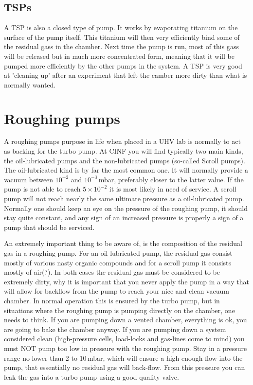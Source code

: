 \documentclass[a4paper,english]{article}
\begin{document}
\subsection{TSPs}
A TSP is also a closed type of pump. It works by evaporating titanium on the surface of the pump itself. This titanium will then very efficiently bind some of the residual gass in the chamber. Next time the pump is run, most of this gass will be released but in much more concentrated form, meaning that it will be pumped more efficiently by the other pumps in the system. A TSP is very good at 'cleaning up' after an experiment that left the camber more dirty than what is normally wanted.

\section{Roughing pumps}
A roughing pumps purpose in life when placed in a UHV lab is normally to act as backing for the turbo pump. At CINF you will find typically two main kinds, the oil-lubricated pumps and the non-lubricated pumps (so-called Scroll pumps). The oil-lubricated kind is by far the most common one. It will normally provide a vacuum between $10^{-2}$ and $10^{-3}$\,mbar, preferably closer to the latter value. If the pump is not able to reach $5\times10^{-2}$ it is most likely in need of service. A scroll pump will not reach nearly the same ultimate pressure as a oil-lubricated pump. Normally one should keep an eye on the pressure of the roughing pump, it should stay quite constant, and any sign of an increased pressure is properly a sign of a pump that should be serviced.

An extremely important thing to be aware of, is the composition of the residual gas in a roughing pump. For an oil-lubricated pump, the residual gas consist mostly of various nasty organic compounds and for a scroll pump it consists mostly of air(?). In both cases the residual gas must be considered to be extremely dirty, why it is important that you never apply the pump in a way that will allow for backflow from the pump to reach your nice and clean vacuum chamber. In normal operation this is ensured by the turbo pump, but in situations where the roughing pump is pumping directly on the chamber, one needs to think. If you are pumping down a vented chamber, everything is ok, you are going to bake the chamber anyway. If you are pumping down a system considered clean (high-pressure cells, load-locks and gas-lines come to mind) you must NOT pump too low in pressure with the roughing pump. Stay in a pressure range no lower than 2 to 10\,mbar, which will ensure a high enough flow into the pump, that essentially no residual gas will back-flow. From this pressure you can leak the gas into a turbo pump using a good quality valve.
\end{document}
